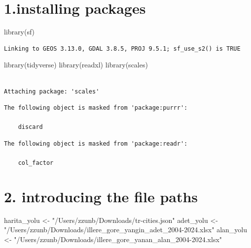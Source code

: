 \documentclass[
  11pt,
  a4paper,
  DIV=11,
  numbers=noendperiod]{scrartcl}
\newenvironment{Shaded}{\begin{snugshade}}{\end{snugshade}}
\newcommand{\FunctionTok}[1]{\textcolor[rgb]{0.28,0.35,0.67}{#1}}
\newcommand{\NormalTok}[1]{\textcolor[rgb]{0.00,0.23,0.31}{#1}}
\newcommand{\OtherTok}[1]{\textcolor[rgb]{0.00,0.23,0.31}{#1}}
\newcommand{\StringTok}[1]{\textcolor[rgb]{0.13,0.47,0.30}{#1}}
\begin{document}
\section{1.installing packages}\label{installing-packages}

\begin{Shaded}
\begin{Highlighting}[]
\FunctionTok{library}\NormalTok{(sf)}
\end{Highlighting}
\end{Shaded}

\begin{verbatim}
Linking to GEOS 3.13.0, GDAL 3.8.5, PROJ 9.5.1; sf_use_s2() is TRUE
\end{verbatim}

\begin{Shaded}
\begin{Highlighting}[]
\FunctionTok{library}\NormalTok{(tidyverse)}
\FunctionTok{library}\NormalTok{(readxl)}
\FunctionTok{library}\NormalTok{(scales) }
\end{Highlighting}
\end{Shaded}

\begin{verbatim}

Attaching package: 'scales'
\end{verbatim}

\begin{verbatim}
The following object is masked from 'package:purrr':

    discard
\end{verbatim}

\begin{verbatim}
The following object is masked from 'package:readr':

    col_factor
\end{verbatim}

\section{2. introducing the file
paths}\label{introducing-the-file-paths}

\begin{Shaded}
\begin{Highlighting}[]
\NormalTok{harita\_yolu }\OtherTok{\textless{}{-}} \StringTok{"/Users/zzunb/Downloads/tr{-}cities.json"}
\NormalTok{adet\_yolu }\OtherTok{\textless{}{-}} \StringTok{"/Users/zzunb/Downloads/illere\_gore\_yangin\_adet\_2004{-}2024.xlsx"}
\NormalTok{alan\_yolu }\OtherTok{\textless{}{-}} \StringTok{"/Users/zzunb/Downloads/illere\_gore\_yanan\_alan\_2004{-}2024.xlsx"}
\end{Highlighting}
\end{Shaded}
\end{document}
